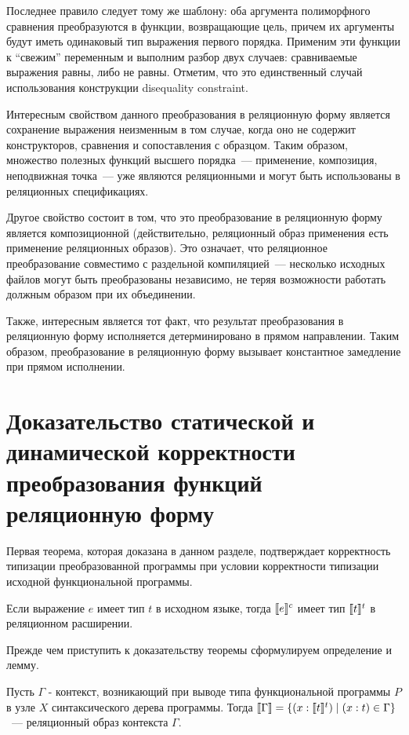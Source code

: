 Последнее правило следует тому же шаблону: оба аргумента полиморфного сравнения преобразуются в функции, возвращающие цель, причем их аргументы будут иметь одинаковый тип выражения первого порядка. Применим эти функции к ``свежим'' переменным и выполним разбор двух случаев: сравниваемые выражения равны, либо не равны. Отметим, что это единственный случай использования конструкции disequality constraint.

Интересным свойством данного преобразования в реляционную форму является сохранение выражения неизменным в том случае, когда оно не содержит конструкторов, сравнения и сопоставления с образцом. Таким образом, множество полезных функций высшего порядка~--- применение, композиция, неподвижная точка~--- уже являются реляционными и могут быть использованы в реляционных спецификациях.

Другое свойство состоит в том, что это преобразование в реляционную форму является композиционной (действительно, реляционный образ применения есть применение реляционных образов). Это означает, что реляционное преобразование совместимо с раздельной компиляцией~--- несколько исходных файлов могут быть преобразованы независимо, не теряя возможности работать должным образом при их объединении.

Также, интересным является тот факт, что результат преобразования в реляционную форму исполняется детерминировано в прямом направлении. Таким образом, преобразование в реляционную форму вызывает константное замедление при прямом исполнении.

\section{Доказательство статической и динамической корректности преобразования функций реляционную форму}

Первая теорема, которая доказана в данном разделе, подтверждает корректность типизации преобразованной программы при условии корректности типизации исходной функциональной программы.

\begin{theorem} 
\normalfont Если выражение $e$ имеет тип $t$ в исходном языке, тогда $\llbracket{e}\rrbracket^c$ имеет тип $\llbracket{t}\rrbracket^t$ в реляционном расширении.
\end{theorem}

Прежде чем приступить к доказательству теоремы сформулируем определение и лемму.

\begin{definition}
\normalfont Пусть $\Gamma$ - контекст, возникающий при выводе типа функциональной программы $P$ в узле $X$ синтаксического дерева программы. Тогда $\llbracket{\Gamma}\rrbracket = \{(x : \llbracket{t}\rrbracket^t) \mid (x:t)\in \Gamma\}$~--- реляционный образ контекста $\Gamma$.
\end{definition}

